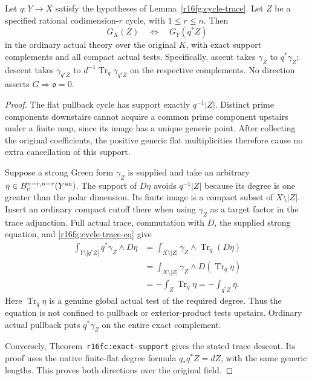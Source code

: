 \begin{theorem}
\label{r16fg:equivalence}
Let $q:Y\to X$ satisfy the hypotheses of
Lemma~\ref{r16fg:cycle-trace}. Let $Z$ be a specified rational
codimension-$r$ cycle, with $1\leq r\leq n$. Then
\[
                         G_X(Z)\quad\Longleftrightarrow\quad G_Y(q^*Z)
 \tag{FG16.2}\label{r16fg:equivalence-eq}
\]
in the ordinary actual theory over the original $K$, with exact
support complements and all compact actual tests. Specifically,
ascent takes $\gamma_Z$ to $q^*\gamma_Z$; descent takes
$\gamma_{q^*Z}$ to $d^{-1}\operatorname{Tr}_q\gamma_{q^*Z}$
on the respective complements. No direction asserts
$G\Rightarrow\mathfrak o=0$.
\end{theorem}

\begin{proof}
The flat pullback cycle has support exactly $q^{-1}|Z|$.
Distinct prime components downstairs cannot acquire a common
prime component upstairs under a finite map, since its image
has a unique generic point. After collecting the original
coefficients, the positive generic flat multiplicities therefore
cause no extra cancellation of this support.

Suppose a strong Green form $\gamma_Z$ is supplied and take
an arbitrary $\eta\in B_c^{n-r,n-r}(Y^{\rm an})$.
The support of $D\eta$ avoids $q^{-1}|Z|$ because its degree
is one greater than the polar dimension. Its finite image is
a compact subset of $X\setminus|Z|$. Insert an ordinary compact
cutoff there when using $\gamma_Z$ as a target factor in the
trace adjunction. Full actual trace, commutation with $D$, the
supplied strong equation, and \eqref{r16fg:cycle-trace-eq} give
\[
 \begin{split}
 \int_{Y\setminus|q^*Z|}q^*\gamma_Z\wedge D\eta
   &=\int_{X\setminus|Z|}\gamma_Z\wedge\operatorname{Tr}_q(D\eta)\\
   &=\int_{X\setminus|Z|}\gamma_Z\wedge D(\operatorname{Tr}_q\eta)\\
   &=-\int_Z\operatorname{Tr}_q\eta
    =-\int_{q^*Z}\eta.
 \end{split}
 \tag{FG16.3}\label{r16fg:ascent-eq}
\]
Here $\operatorname{Tr}_q\eta$ is a genuine global actual test
of the required degree. Thus the equation is not confined to
pullback or exterior-product tests upstairs. Ordinary actual
pullback puts $q^*\gamma_Z$ on the entire exact complement.

Conversely, Theorem~\texttt{r16fc:exact-support} gives the
stated trace descent. Its proof uses the native finite-flat
degree formula $q_*q^*Z=dZ$, with the same generic lengths.
This proves both directions over the original field.
\end{proof}

